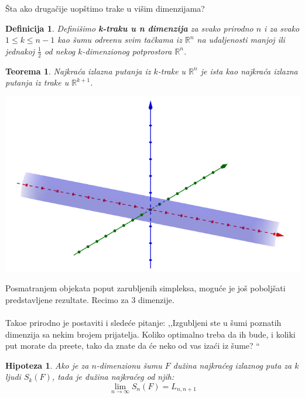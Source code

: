 \documentclass[b1paper,portrait]{template/baposter}
\newtheorem{theorem}{Teorema}
\newtheorem*{definition}{Definicija}
\newtheorem*{hipoteza}{Hipoteza}
\begin{document}
\begin{poster}
{
	\v Sta ako druga\v cije uop\v stimo trake u vi\v sim dimenzijama? \\
	\begin{definition}
		Defini\v simo \textbf{k-traku u n dimenzija} za svako prirodno $n$ i za svako $1\leqslant k\leqslant n-1$  kao \v sumu odre\dj enu
		svim ta\v ckama iz $\mathbb{R}^n$ na udaljenosti manjoj ili jednakoj $\frac{1}{2}$ od nekog $k$-dimenzionog potprostora $\mathbb{R}^n$. 
	\end{definition}
	\begin{theorem}
		Najkra\' ca izlazna putanja iz $k$-trake u $\mathbb{R}^n$ je ista kao najkra\' ca izlazna putanja iz trake u $\mathbb{R}^{k+1}$.
	\end{theorem}
	 \begin{center}
	 	\begin{minipage}{0.5\linewidth}
			\includegraphics[width=\linewidth]{Valjak}
		\end{minipage}
	\end{center}
}




{
\vspace{0.15cm}
	Posmatranjem objekata poput zarubljenih simpleksa, mogu\' ce je jo\v s pobolj\v sati predstavljene rezultate. Recimo za 3 dimenzije.\\ \\
	Tako\dj e prirodno je postaviti i slede\' ce pitanje:
	,,Izgubljeni ste u \v sumi poznatih dimenzija sa nekim brojem prijatelja. Koliko optimalno treba da ih bude,
	i koliki put morate da pre\dj ete, tako da znate da \' ce neko od vas iza\' ci iz \v sume? ``
	\begin{hipoteza}
		Ako je za $n$-dimenzionu \v sumu $F$ du\v zina najkra\' ceg izlaznog puta za $k$ ljudi $S_k(F)$, tada je du\v zina najkra\' ceg od njih:
		$$\lim_{n \to \infty} S_n(F) = L_{n,n+1}$$
	\end{hipoteza}
	\vspace{0.2cm}
}

\end{poster}
\end{document}
